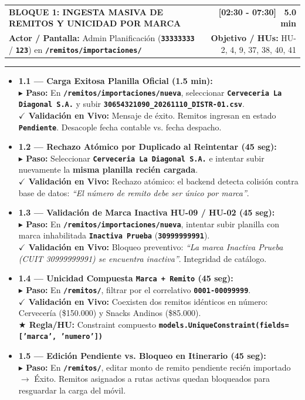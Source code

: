 \documentclass[a4paper,9pt]{article}
\makeatletter
\newcommand{\stepact}[1]{\textbf{$\blacktriangleright$ Paso:} #1}
\newcommand{\valact}[1]{\textbf{$\checkmark$ Validación en Vivo:} #1}
\newcommand{\ruleact}[1]{\textbf{$\bigstar$ Regla/HU:} #1}
\newcommand{\codeb}[1]{\texttt{\bfseries #1}}
\newcommand{\blockheader}[4]{%
  \begin{tabularx}{\textwidth}{@{}X r@{}}
    {\fontsize{10.5pt}{12.5pt}\selectfont\textbf{#1}} & {\normalsize\textbf{#2}} \\
    {\footnotesize\textbf{Actor / Pantalla:} #3} & {\footnotesize\textbf{Objetivo / HUs:} #4}
  \end{tabularx}%
  \vspace{-2pt}\hrule\vspace{3.5pt}%
}
\makeatother
\begin{document}
\begin{tcolorbox}[cardframe, top=2.5pt, bottom=2.5pt]
\blockheader{BLOQUE 1: INGESTA MASIVA DE REMITOS Y UNICIDAD POR MARCA}{[02:30 - 07:30] \textbar\ 5.0 min}{Admin Planificación (\codeb{33333333} / \codeb{123}) en \codeb{/remitos/importaciones/}}{HU-2, 4, 9, 37, 38, 40, 41}
{\footnotesize
\begin{itemize}
\item \textbf{1.1 — Carga Exitosa Planilla Oficial (1.5 min):} \\
\stepact{En \codeb{/remitos/importaciones/nueva}, seleccionar \codeb{Cerveceria La Diagonal S.A.} y subir \codeb{30654321090\_20261110\_DISTR-01.csv}.} \\
\valact{Mensaje de éxito. Remitos ingresan en estado \codeb{Pendiente}. Desacople fecha contable vs. fecha despacho.}
\item \textbf{1.2 — Rechazo Atómico por Duplicado al Reintentar (45 seg):} \\
\stepact{Seleccionar \codeb{Cerveceria La Diagonal S.A.} e intentar subir nuevamente la \textbf{misma planilla recién cargada}.} \\
\valact{Rechazo atómico: el backend detecta colisión contra base de datos: \textit{``El número de remito debe ser único por marca''}.}
\item \textbf{1.3 — Validación de Marca Inactiva HU-09 / HU-02 (45 seg):} \\
\stepact{En \codeb{/remitos/importaciones/nueva}, intentar subir planilla con marca inhabilitada \codeb{Inactiva Prueba} (\codeb{30999999991}).} \\
\valact{Bloqueo preventivo: \textit{``La marca Inactiva Prueba (CUIT 30999999991) se encuentra inactiva''}. Integridad de catálogo.}
\item \textbf{1.4 — Unicidad Compuesta \codeb{Marca + Remito} (45 seg):} \\
\stepact{En \codeb{/remitos/}, filtrar por el correlativo \codeb{0001-00099999}.} \\
\valact{Coexisten dos remitos idénticos en número: Cervecería (\$150.000) y Snacks Andinos (\$85.000).} \\
\ruleact{Constraint compuesto \codeb{models.UniqueConstraint(fields=['marca', 'numero'])}}
\item \textbf{1.5 — Edición Pendiente vs. Bloqueo en Itinerario (45 seg):} \\
\stepact{En \codeb{/remitos/}, editar monto de remito pendiente recién importado $\rightarrow$ Éxito. Remitos asignados a rutas activas quedan bloqueados para resguardar la carga del móvil.}

\end{itemize}}
\end{tcolorbox}
\end{document}
